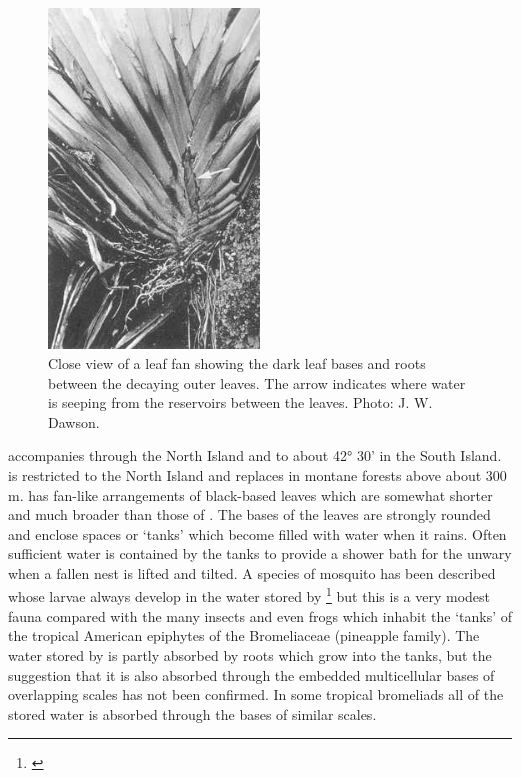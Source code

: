 \begin{figure}
	\includegraphics[width=0.5\textwidth]{graphics/figure41collospermum.jpg}
	\centering
	\caption[Close view of a Collospermum hastatum leaf fan]{Close view of a  leaf fan showing the dark leaf bases and roots between the decaying outer leaves.
	The arrow indicates where water is seeping from the reservoirs between the leaves.
	Photo: J. W. Dawson.}%
	\label{fig:41collospermum}
\end{figure}

 accompanies  through the North Island and to about 42° 30' in the South Island.  is restricted to the North Island and replaces  in montane forests above about 300 m.  has fan-like arrangements of black-based leaves which are somewhat shorter and much broader than those of .
The bases of the leaves are strongly rounded and enclose spaces or `tanks' which become filled with water when it rains.
Often sufficient water is contained by the tanks to provide a shower bath for the unwary when a fallen  nest is lifted and tilted.
A species of mosquito has been described whose larvae always develop in the water stored by \footnote{\cite{belkin1968mosquito}} but this is a very modest fauna compared with the many insects and even frogs which inhabit the `tanks' of the tropical American epiphytes of the Bromeliaceae (pineapple family).
The water stored by  is partly absorbed by roots which grow into the tanks, but the suggestion that it is also absorbed through the embedded multicellular bases of overlapping scales has not been confirmed.
In some tropical bromeliads all of the stored water is absorbed through the bases of similar scales.

